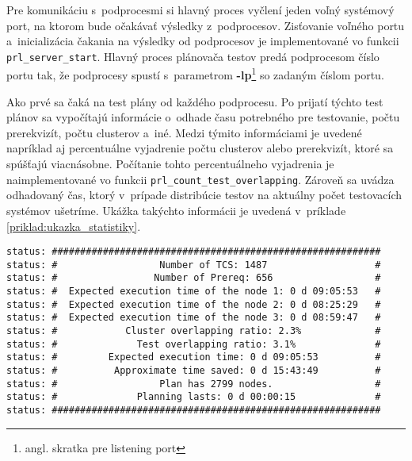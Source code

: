 Pre komunikáciu s~podprocesmi si hlavný proces vyčlení jeden voľný 
systémový port, na ktorom bude očakávať výsledky z~podprocesov. 
Zisťovanie voľného portu a~inicializácia čakania na výsledky od 
podprocesov je implementované vo funkcii \texttt{prl\_server\_start}. 
Hlavný proces plánovača testov predá podprocesom číslo portu tak, že 
podprocesy spustí s~parametrom 
\textbf{-lp}\footnote{angl. skratka pre listening port} so zadaným
číslom portu.

Ako prvé sa čaká na test plány od každého podprocesu. 
Po prijatí týchto test plánov sa vypočítajú informácie
o~odhade času potrebného pre testovanie, počtu prerekvizít, počtu clusterov a~iné.
Medzi týmito informáciami je uvedené napríklad aj percentuálne vyjadrenie 
počtu clusterov alebo prerekvizít, ktoré sa spúšťajú viacnásobne. 
Počítanie tohto percentuálneho vyjadrenia 
je naimplementované vo funkcii \texttt{prl\_count\_test\_overlapping}.
Zároveň sa uvádza odhadovaný čas, ktorý v~prípade distribúcie testov
na aktuálny počet testovacích systémov ušetríme. 
Ukážka takýchto informácii je uvedená v~príklade \ref{priklad:ukazka_statistiky}.

\begin{lstlisting}[caption=Informácie zobrazované pred spustením regresných testoch,
label=priklad:ukazka_statistiky]
status: ##########################################################
status: #                  Number of TCS: 1487                   #
status: #                 Number of Prereq: 656                  #
status: #  Expected execution time of the node 1: 0 d 09:05:53   #
status: #  Expected execution time of the node 2: 0 d 08:25:29   #
status: #  Expected execution time of the node 3: 0 d 08:59:47   #
status: #            Cluster overlapping ratio: 2.3%             #
status: #              Test overlapping ratio: 3.1%              #
status: #         Expected execution time: 0 d 09:05:53          #
status: #          Approximate time saved: 0 d 15:43:49          #
status: #                  Plan has 2799 nodes.                  #
status: #              Planning lasts: 0 d 00:00:15              #
status: ##########################################################
\end{lstlisting}

